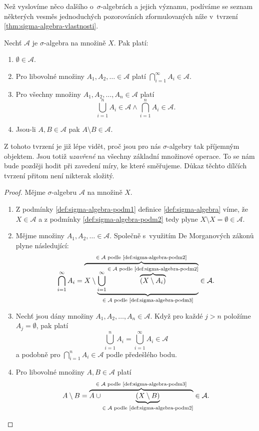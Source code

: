 Než vyslovíme něco dalšího o~$\sigma$-algebrách a jejich významu, podíváme se seznam některých vesměs jednoduchých pozorováních zformulovaných níže v~tvrzení \ref{thm:sigma-algebra-vlastnosti}.
\begin{theorem}\label{thm:sigma-algebra-vlastnosti}
    Nechť $\mathcal{A}$ je $\sigma$-algebra na množině $X$. Pak platí:
    \begin{enumerate}[label=(\roman*)]
        \item $\emptyset\in\mathcal{A}$.
        \item Pro libovolné množiny $A_1,A_2,\ldots\in\mathcal{A}$ platí $\bigcap_{i=1}^\infty A_i\in\mathcal{A}$.
        \item Pro všechny množiny $A_1,A_2,\ldots,A_n\in\mathcal{A}$ platí
        \[\bigcup_{i=1}^n A_i\in\mathcal{A}\land\bigcap_{i=1}^n A_i\in\mathcal{A}.\]
        \item Jsou-li $A,B\in\mathcal{A}$ pak $A\setminus B\in\mathcal{A}$.
    \end{enumerate}
\end{theorem}

Z tohoto tvrzení je již lépe vidět, proč jsou pro nás $\sigma$-algebry tak příjemným objektem. Jsou totiž \emph{uzavřené} na všechny základní množinové operace. To se nám bude později hodit při zavedení míry, ke které směřujeme. Důkaz těchto dílčích tvrzení přitom není nikterak složitý.
\begin{proof}
    Mějme $\sigma$-algebru $\mathcal{A}$ na množině $X$.
    \begin{enumerate}[label=\textit{(\roman*)}]
        \item Z podmínky \ref{def:sigma-algebra-podm1} definice \ref{def:sigma-algebra} víme, že $X\in\mathcal{A}$ a z podmínky \ref{def:sigma-algebra-podm2} tedy plyne $X\setminus X=\emptyset\in\mathcal{A}$.
        \item Mějme množiny $A_1,A_2,\ldots\in\mathcal{A}$. Společně s~využitím De Morganových zákonů plyne následující:
        \[\bigcap\limits_{i=1}^\infty A_i=\overbrace{X\setminus\underbrace{\bigcup\limits_{i=1}^\infty \overbrace{(X\setminus A_i)}^{\text{$\in\mathcal{A}$ podle \ref{def:sigma-algebra-podm2}}}}_{\text{$\in\mathcal{A}$ podle \ref{def:sigma-algebra-podm3}}}}^\text{$\in\mathcal{A}$ podle \ref{def:sigma-algebra-podm2}}\in\mathcal{A}.\]
        \item Nechť jsou dány množiny $A_1,A_2,\ldots,A_n\in\mathcal{A}$. Když pro každé $j>n$ položíme $A_j=\emptyset$, pak platí
        \[\bigcup\limits_{i=1}^n A_i=\bigcup\limits_{i=1}^\infty A_i\in\mathcal{A}\]
        a podobně pro $\bigcap_{i=1}^n A_i\in\mathcal{A}$ podle předešlého bodu.
        \item Pro libovolné množiny $A,B\in\mathcal{A}$ platí
        \[A\setminus B=\overbrace{A\cup\underbrace{(X\setminus B)}_{\text{$\in\mathcal{A}$ podle \ref{def:sigma-algebra-podm2}}}}^{\text{$\in\mathcal{A}$ podle \ref{def:sigma-algebra-podm3}}}\in\mathcal{A}.\]
    \end{enumerate}
\end{proof}

